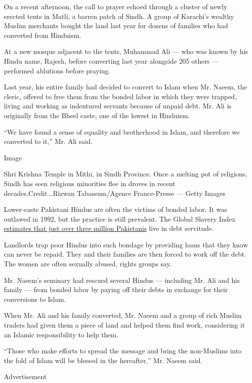 On a recent afternoon, the call to prayer echoed through a cluster of
newly erected tents in Matli, a barren patch of Sindh. A group of
Karachi's wealthy Muslim merchants bought the land last year for dozens
of families who had converted from Hinduism.

At a new mosque adjacent to the tents, Muhammad Ali --- who was known by
his Hindu name, Rajesh, before converting last year alongside 205 others
--- performed ablutions before praying.

Last year, his entire family had decided to convert to Islam when Mr.
Naeem, the cleric, offered to free them from the bonded labor in which
they were trapped, living and working as indentured servants because of
unpaid debt. Mr. Ali is originally from the Bheel caste, one of the
lowest in Hinduism.

``We have found a sense of equality and brotherhood in Islam, and
therefore we converted to it,'' Mr. Ali said.

Image

Shri Krishna Temple in Mithi, in Sindh Province. Once a melting pot of
religions, Sindh has seen religious minorities flee in droves in recent
decades.Credit...Rizwan Tabassum/Agence France-Presse --- Getty Images

Lower-caste Pakistani Hindus are often the victims of bonded labor. It
was outlawed in 1992, but the practice is still prevalent. The Global
Slavery Index
\href{https://www.globalslaveryindex.org/2018/data/maps/\#prevalence}{estimates
that just over three million Pakistanis} live in debt servitude.

Landlords trap poor Hindus into such bondage by providing loans that
they know can never be repaid. They and their families are then forced
to work off the debt. The women are often sexually abused, rights groups
say.

Mr. Naeem's seminary had rescued several Hindus --- including Mr. Ali
and his family --- from bonded labor by paying off their debts in
exchange for their conversions to Islam.

When Mr. Ali and his family converted, Mr. Naeem and a group of rich
Muslim traders had given them a piece of land and helped them find work,
considering it an Islamic responsibility to help them.

``Those who make efforts to spread the message and bring the non-Muslims
into the fold of Islam will be blessed in the hereafter,'' Mr. Naeem
said.

Advertisement

